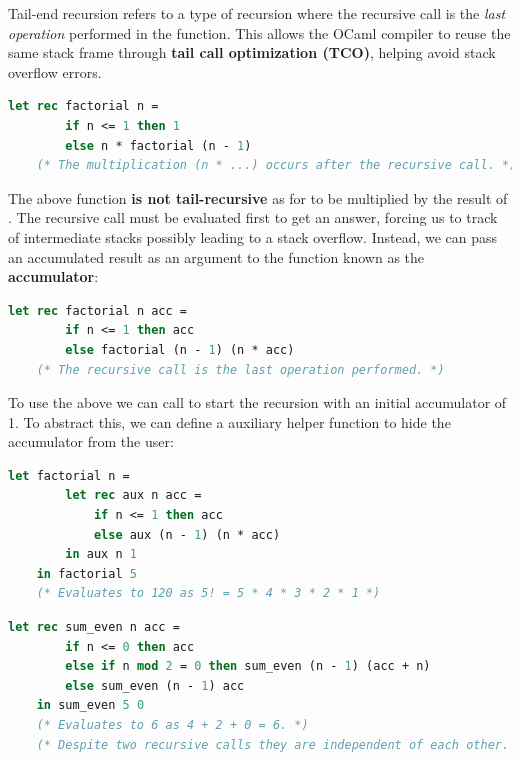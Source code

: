 \begin{Def}

    Tail-end recursion refers to a type of recursion where the recursive call is the \emph{last operation} performed in the function. 
    This allows the OCaml compiler to reuse the same stack frame through \textbf{tail call optimization (TCO)}, helping avoid stack overflow errors.
    
    \begin{lstlisting}[language=OCaml, caption={Non-Tail-Recursive Factorial Function}, numbers=none]
    let rec factorial n =
        if n <= 1 then 1
        else n * factorial (n - 1)
    (* The multiplication (n * ...) occurs after the recursive call. *)
    \end{lstlisting}
    
    \noindent The above function \textbf{is not tail-recursive} as for  to be multiplied by the result of\\
    . The recursive call must be evaluated first to get an answer, forcing us to track of intermediate stacks possibly leading to a stack overflow.
    Instead, we can pass an accumulated result as an argument to the function known as the \textbf{accumulator}:
    
    \begin{lstlisting}[language=OCaml, caption={Tail-Recursive Factorial Function}, numbers=none]
    let rec factorial n acc =
        if n <= 1 then acc
        else factorial (n - 1) (n * acc)
    (* The recursive call is the last operation performed. *)
    \end{lstlisting}

    \noindent To use the above we can call  to start the recursion with an initial accumulator of 1.
    To abstract this, we can define a auxiliary helper function to hide the accumulator from the user:

    \begin{lstlisting}[language=OCaml, caption={Tail-Recursive Factorial Function with Helper}, numbers=none]
    let factorial n =
        let rec aux n acc =
            if n <= 1 then acc
            else aux (n - 1) (n * acc)
        in aux n 1
    in factorial 5
    (* Evaluates to 120 as 5! = 5 * 4 * 3 * 2 * 1 *)
    \end{lstlisting}

    \begin{lstlisting}[language=OCaml, caption={Tail-Recursive Summation of Positive Even Numbers}, numbers=none]
    let rec sum_even n acc =
        if n <= 0 then acc
        else if n mod 2 = 0 then sum_even (n - 1) (acc + n)
        else sum_even (n - 1) acc
    in sum_even 5 0
    (* Evaluates to 6 as 4 + 2 + 0 = 6. *)
    (* Despite two recursive calls they are independent of each other. *)
    \end{lstlisting}
        
\end{Def}

